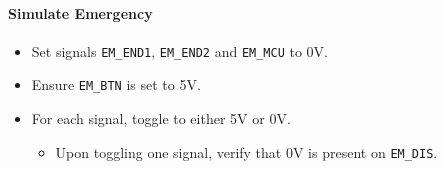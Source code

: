\paragraph{Simulate Emergency} %
\label{par:simulate_no_emergency}
\begin{itemize}
	\item Set signals \texttt{EM\_END1}, \texttt{EM\_END2} and \texttt{EM\_MCU} to 0V.
	\item Ensure \texttt{EM\_BTN} is set to 5V.
	\item For each signal, toggle to either 5V or 0V.
	\begin{itemize}
		\item[\cmark] Upon toggling one signal, verify that 0V is present on \texttt{EM\_DIS}.
	\end{itemize}
\end{itemize}
